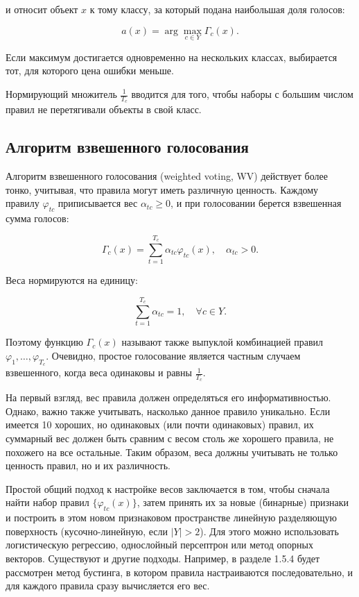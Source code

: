 и относит объект $x$ к тому классу, за который подана наибольшая доля голосов:

\[
a(x) = \arg \max_{c \in Y} \Gamma_c(x).
\]

Если максимум достигается одновременно на нескольких классах, выбирается тот, для которого цена ошибки меньше.

Нормирующий множитель $\frac{1}{T_c}$ вводится для того, чтобы наборы с большим числом правил не перетягивали объекты в свой класс.

\subsection{Алгоритм взвешенного голосования}
Алгоритм взвешенного голосования (weighted voting, WV) действует более тонко, учитывая, что правила могут иметь различную ценность. Каждому правилу $\varphi_{tc}$ приписывается вес $\alpha_{tc} \geq 0$, и при голосовании берется взвешенная сумма голосов:

\[
\Gamma_c(x) = \sum_{t=1}^{T_c} \alpha_{tc} \varphi_{tc}(x), \quad \alpha_{tc} > 0.
\]

Веса нормируются на единицу:

\[
\sum_{t=1}^{T_c} \alpha_{tc} = 1, \quad \forall c \in Y.
\]

Поэтому функцию $\Gamma_c(x)$ называют также выпуклой комбинацией правил $\varphi_1, \dots, \varphi_{T_c}$. Очевидно, простое голосование является частным случаем взвешенного, когда веса одинаковы и равны $\frac{1}{T_c}$.

На первый взгляд, вес правила должен определяться его информативностью. Однако, важно также учитывать, насколько данное правило уникально. Если имеется 10 хороших, но одинаковых (или почти одинаковых) правил, их суммарный вес должен быть сравним с весом столь же хорошего правила, не похожего на все остальные. Таким образом, веса должны учитывать не только ценность правил, но и их различность.

Простой общий подход к настройке весов заключается в том, чтобы сначала найти набор правил $\{ \varphi_{tc}(x) \}$, затем принять их за новые (бинарные) признаки и построить в этом новом признаковом пространстве линейную разделяющую поверхность (кусочно-линейную, если $|Y| > 2$). Для этого можно использовать логистическую регрессию, однослойный персептрон или метод опорных векторов. Существуют и другие подходы. Например, в разделе 1.5.4 будет рассмотрен метод бустинга, в котором правила настраиваются последовательно, и для каждого правила сразу вычисляется его вес.

